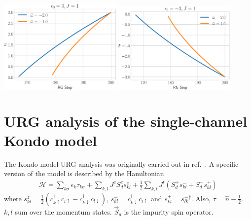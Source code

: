 \begin{center}
	\includegraphics[width=0.45\textwidth]{../figures/zero2.pdf}
	\hspace*{\fill}
	\includegraphics[width=0.45\textwidth]{../figures/zero1.pdf}
	\label{plot2}
\end{center}
\section{URG analysis of the single-channel Kondo model}
\label{kondourg}
The Kondo model URG analysis was originally carried out in ref.~\cite{}. A specific version of the model is described by the Hamiltonian
\begin{equation}\begin{aligned}
	\mathcal{H} = \sum_{k\sigma}\epsilon_{k}\tau_{k\sigma} + \sum_{k,l} J^z S_d^z s^z_{kl} + \frac{1}{2}\sum_{k,l} J^t \left(S_d^+ s^-_{kl}  + S_d^- s^+_{kl}\right)
\end{aligned}\end{equation}
where \(s^z_{kl} = \frac{1}{2}\left(c^\dagger_{k\uparrow}c_{l \uparrow} - c^\dagger_{k\downarrow}c_{l \downarrow}\right)\), \(s^-_{kl} = c^\dagger_{k \downarrow}c_{l \uparrow}\) and \(s^+_{kl} = {s^-_{lk}}^\dagger\). Also, \(\tau = \hat n - \frac{1}{2}\). \(k,l\) sum over the momentum states. \(\vec S_d\) is the impurity spin operator.

